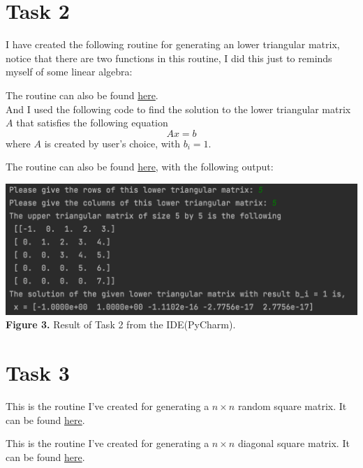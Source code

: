 \documentclass{article}
\begin{document}
\section*{Task 2}
I have created the following routine for generating an lower triangular matrix, notice that there are two functions in this routine, I did this just to reminds myself of some linear algebra:

The routine can also be found \href{https://github.com/GoByMark/math4610/blob/main/Homework_Tasks/Tasksheet_07/src/matrixL.py}{here}.\\
And I used the following code to find the solution to the lower triangular matrix $A$ that satisfies the following equation 
$$A x = b$$
where $A$ is created by user's choice, with $b_i = 1$. 

The routine can also be found \href{https://github.com/GoByMark/math4610/blob/main/Homework_Tasks/Tasksheet_07/src/Task_2.py}{here}, with the following output:
\begin{center}
\includegraphics[width=\textwidth]{Screenshots/2.png}
{\bf Figure 3.} Result of Task 2 from the IDE(PyCharm).
\end{center}

\section*{Task 3}
This is the routine I've created for generating a $n \times n$ random square matrix. It can be found \href{https://github.com/GoByMark/math4610/blob/main/Homework_Tasks/Tasksheet_07/src/matrixS.py}{here}.

This is the routine I've created for generating a $n \times n$ diagonal square matrix. It can be found \href{https://github.com/GoByMark/math4610/blob/main/Homework_Tasks/Tasksheet_07/src/matrixD.py}{here}.

\end{document}
